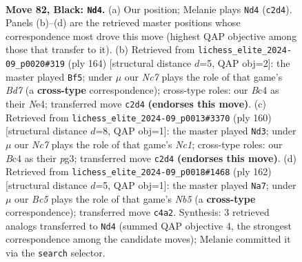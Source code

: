 \documentclass[11pt]{article}
\begin{document}
\clearpage

\begin{figure}[p]\centering
\begin{subfigure}{0.46\textwidth}\centering
\resizebox{\linewidth}{!}{%
\newchessgame
\chessboard[
  setfen={8/7k/8/8/2b2B2/8/2n2PK1/8 b - - 10 82},
  showmover=false,
  pgfstyle=straightmove, color=movearrow, markmove={c2-d4}
]}
\caption{}
\end{subfigure}\hfill
\begin{subfigure}{0.46\textwidth}\centering
\resizebox{\linewidth}{!}{%
\newchessgame
\chessboard[
  setfen={8/1K1B4/8/4b2p/4N2k/8/8/8 w - - 38 83},
  showmover=false,
  pgfstyle=straightmove, color=movearrow, markmove={d7-f5}
]}
\caption{}
\end{subfigure}
\\[4pt]
\begin{subfigure}{0.46\textwidth}\centering
\resizebox{\linewidth}{!}{%
\newchessgame
\chessboard[
  setfen={8/8/8/8/p3K3/k5p1/8/2N5 w - - 0 81},
  showmover=false,
  pgfstyle=straightmove, color=movearrow, markmove={c1-d3}
]}
\caption{}
\end{subfigure}\hfill
\begin{subfigure}{0.46\textwidth}\centering
\resizebox{\linewidth}{!}{%
\newchessgame
\chessboard[
  setfen={8/8/8/1N1b2p1/6k1/4K3/8/8 w - - 0 82},
  showmover=false,
  pgfstyle=straightmove, color=movearrow, markmove={b5-a7}
]}
\caption{}
\end{subfigure}
\caption{\textbf{Move 82, Black: \texttt{Nd4}.} (a) Our position; Melanie plays \texttt{Nd4} (\texttt{c2d4}). Panels (b)--(d) are the retrieved master positions whose correspondence most drove this move (highest QAP objective among those that transfer to it). (b) Retrieved from \texttt{lichess\_elite\_2024-09\_p0020\#319} (ply 164) [structural distance $d$=5, QAP obj=2]: the master played \texttt{Bf5}; under $\mu$ our \emph{Nc7} plays the role of that game's \emph{Bd7} (a \textbf{cross-type} correspondence); cross-type roles: our \emph{B}c4 as their \emph{N}e4; transferred move \texttt{c2d4} \textbf{(endorses this move)}. (c) Retrieved from \texttt{lichess\_elite\_2024-09\_p0013\#3370} (ply 160) [structural distance $d$=8, QAP obj=1]: the master played \texttt{Nd3}; under $\mu$ our \emph{Nc7} plays the role of that game's \emph{Nc1}; cross-type roles: our \emph{B}c4 as their \emph{p}g3; transferred move \texttt{c2d4} \textbf{(endorses this move)}. (d) Retrieved from \texttt{lichess\_elite\_2024-09\_p0018\#1468} (ply 162) [structural distance $d$=5, QAP obj=1]: the master played \texttt{Na7}; under $\mu$ our \emph{Bc5} plays the role of that game's \emph{Nb5} (a \textbf{cross-type} correspondence); transferred move \texttt{c4a2}. Synthesis: 3 retrieved analogs transferred to \texttt{Nd4} (summed QAP objective 4, the strongest correspondence among the candidate moves); Melanie committed it via the \texttt{search} selector.}
\label{fig:thought-m163}
\end{figure}
\end{document}
